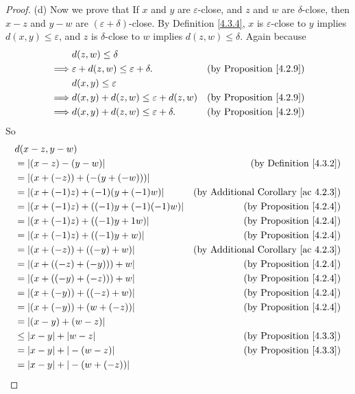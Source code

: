 \begin{proof}{(d)}
Now we prove that If \(x\) and \(y\) are \(\varepsilon\)-close, and \(z\) and \(w\) are \(\delta\)-close, then \(x - z\) and \(y - w\) are \((\varepsilon + \delta)\)-close.
By Definition \ref{4.3.4}, \(x\) is \(\varepsilon\)-close to \(y\) implies \(d(x, y) \leq \varepsilon\), and \(z\) is \(\delta\)-close to \(w\) implies \(d(z, w) \leq \delta\).
Again because
\begin{align*}
& d(z, w) \leq \delta \\
\implies & \varepsilon + d(z, w) \leq \varepsilon + \delta. & \text{(by Proposition \ref{4.2.9})} \\
& d(x, y) \leq \varepsilon \\
\implies & d(x, y) + d(z, w) \leq \varepsilon + d(z, w) & \text{(by Proposition \ref{4.2.9})} \\
\implies & d(x, y) + d(z, w) \leq \varepsilon + \delta. & \text{(by Proposition \ref{4.2.9})}
\end{align*}
So
\begin{align*}
& d(x - z, y - w) \\
&= |(x - z) - (y - w)| & \text{(by Definition \ref{4.3.2})} \\
&= |(x + (-z)) + (-(y + (-w)))| \\
&= |(x + (-1)z) + (-1)(y + (-1)w)| & \text{(by Additional Corollary \ref{ac 4.2.3})} \\
&= |(x + (-1)z) + ((-1)y + (-1)(-1)w)| & \text{(by Proposition \ref{4.2.4})} \\
&= |(x + (-1)z) + ((-1)y + 1w)| & \text{(by Proposition \ref{4.2.4})} \\
&= |(x + (-1)z) + ((-1)y + w)| & \text{(by Proposition \ref{4.2.4})} \\
&= |(x + (-z)) + ((-y) + w)| & \text{(by Additional Corollary \ref{ac 4.2.3})} \\
&= |(x + ((-z) + (-y))) + w| & \text{(by Proposition \ref{4.2.4})} \\
&= |(x + ((-y) + (-z))) + w| & \text{(by Proposition \ref{4.2.4})} \\
&= |(x + (-y)) + ((-z) + w)| & \text{(by Proposition \ref{4.2.4})} \\
&= |(x + (-y)) + (w + (-z))| & \text{(by Proposition \ref{4.2.4})} \\
&= |(x - y) + (w - z)| \\
&\leq |x - y| + |w - z| & \text{(by Proposition \ref{4.3.3})} \\
&= |x - y| + |-(w - z)| & \text{(by Proposition \ref{4.3.3})} \\
&= |x - y| + |-(w + (-z))| \\

\end{align*}
\end{proof}
